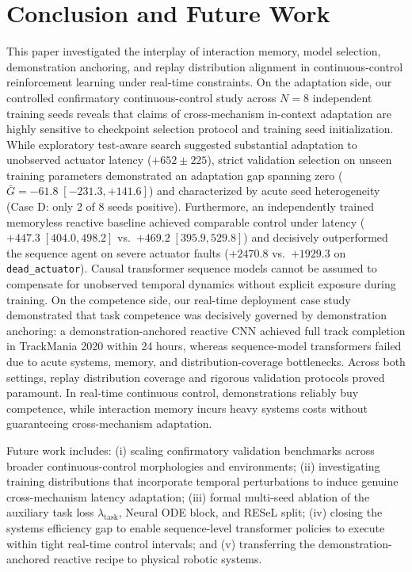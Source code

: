\documentclass[conference]{IEEEtran}
\begin{document}
\section{Conclusion and Future Work}
\label{sec:conclusion}
This paper investigated the interplay of interaction memory, model selection, demonstration anchoring, and replay distribution alignment in continuous-control reinforcement learning under real-time constraints. On the adaptation side, our controlled confirmatory continuous-control study across $N=8$ independent training seeds reveals that claims of cross-mechanism in-context adaptation are highly sensitive to checkpoint selection protocol and training seed initialization. While exploratory test-aware search suggested substantial adaptation to unobserved actuator latency ($+652 \pm 225$), strict validation selection on unseen training parameters demonstrated an adaptation gap spanning zero ($\bar{G} = -61.8 \; [-231.3, +141.6]$) and characterized by acute seed heterogeneity (Case D: only 2 of 8 seeds positive). Furthermore, an independently trained memoryless reactive baseline achieved comparable control under latency ($+447.3 \; [404.0, 498.2]$ vs.\ $+469.2 \; [395.9, 529.8]$) and decisively outperformed the sequence agent on severe actuator faults ($+2470.8$ vs.\ $+1929.3$ on \texttt{dead\_actuator}). Causal transformer sequence models cannot be assumed to compensate for unobserved temporal dynamics without explicit exposure during training. On the competence side, our real-time deployment case study demonstrated that task competence was decisively governed by demonstration anchoring: a demonstration-anchored reactive CNN achieved full track completion in TrackMania 2020 within 24 hours, whereas sequence-model transformers failed due to acute systems, memory, and distribution-coverage bottlenecks. Across both settings, replay distribution coverage and rigorous validation protocols proved paramount. In real-time continuous control, demonstrations reliably buy competence, while interaction memory incurs heavy systems costs without guaranteeing cross-mechanism adaptation.

Future work includes: (i) scaling confirmatory validation benchmarks across broader continuous-control morphologies and environments; (ii) investigating training distributions that incorporate temporal perturbations to induce genuine cross-mechanism latency adaptation; (iii) formal multi-seed ablation of the auxiliary task loss $\lambda_{\text{task}}$, Neural ODE block, and RESeL split; (iv) closing the systems efficiency gap to enable sequence-level transformer policies to execute within tight real-time control intervals; and (v) transferring the demonstration-anchored reactive recipe to physical robotic systems.
\end{document}
